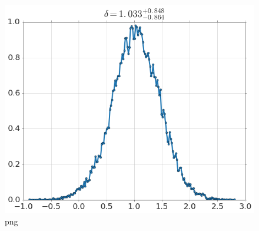 \begin{Shaded}
\begin{Highlighting}[]
\NormalTok{)}
\end{Highlighting}
\end{Shaded}

\begin{figure}[htbp]
\centering
\includegraphics{output_7_0.png}
\caption{png}
\end{figure}

\begin{Shaded}
\begin{Highlighting}[]

\end{Highlighting}
\end{Shaded}

